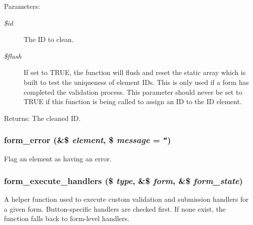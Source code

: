 \begin{Desc}
\item[Parameters:]
\begin{description}
\item[{\em \$id}]The ID to clean. \item[{\em \$flush}]If set to TRUE, the function will flush and reset the static array which is built to test the uniqueness of element IDs. This is only used if a form has completed the validation process. This parameter should never be set to TRUE if this function is being called to assign an ID to the ID element. \end{description}
\end{Desc}
\begin{Desc}
\item[Returns:]The cleaned ID. \end{Desc}
\hypertarget{group__form__api_g0e6b470194005ad3ff2fbf45f671dfa9}{
\subsubsection[{form\_\-error}]{\setlength{\rightskip}{0pt plus 5cm}form\_\-error (\&\$ {\em element}, \/  \$ {\em message} = {\tt ''})}}
\label{group__form__api_g0e6b470194005ad3ff2fbf45f671dfa9}


Flag an element as having an error. \hypertarget{group__form__api_g9e32d49f4ca85da10a29dcfec27dd526}{
\subsubsection[{form\_\-execute\_\-handlers}]{\setlength{\rightskip}{0pt plus 5cm}form\_\-execute\_\-handlers (\$ {\em type}, \/  \&\$ {\em form}, \/  \&\$ {\em form\_\-state})}}
\label{group__form__api_g9e32d49f4ca85da10a29dcfec27dd526}


A helper function used to execute custom validation and submission handlers for a given form. Button-specific handlers are checked first. If none exist, the function falls back to form-level handlers.

